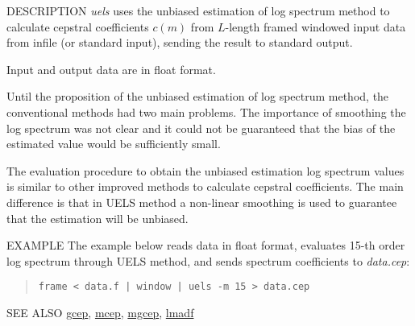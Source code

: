 \begin{synopsis}
\item [uels] [ --m $M$ ] [ --l $L$ ] [ --q $Q$ ] [ --i $I$ ] 
	     [ --j $J$ ] [ --d $D$ ] [ --e $e$ ] [ --E $E$ ] [ {\em infile} ]
\end{synopsis}

\begin{qsection}{DESCRIPTION}
{\em uels} uses the unbiased estimation of log spectrum method 
to calculate cepstral coefficients $c(m)$ 
from $L$-length framed windowed input data
from {\rm infile} (or standard input), 
sending the result to standard output.

Input and output data are in float format.

Until the proposition of the unbiased estimation of
log spectrum method, the conventional methods had
two main problems.
The importance of smoothing the log spectrum
was not clear
and it could not be guaranteed that
the bias of the estimated value would be sufficiently small.

The evaluation procedure to obtain the unbiased estimation
log spectrum values is similar to other improved methods to
calculate cepstral coefficients.
The main difference is that in UELS method a non-linear smoothing
is used to guarantee that the estimation will be unbiased.
\end{qsection}

\begin{options}
\end{options}

\begin{qsection}{EXAMPLE}
The example below reads data in float format,
evaluates 15-th order log spectrum through UELS method,
and sends spectrum coefficients to {\em data.cep}:
\begin{quote}
 \verb!frame < data.f | window | uels -m 15 > data.cep!
\end{quote} 
\end{qsection}

\begin{qsection}{SEE ALSO}
\hyperlink{gcep}{gcep},
\hyperlink{mcep}{mcep},
\hyperlink{mgcep}{mgcep},
\hyperlink{lmadf}{lmadf}
\end{qsection}
